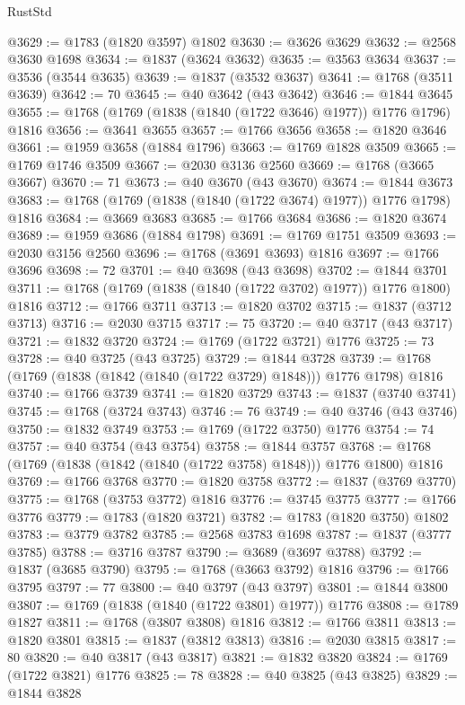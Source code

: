 \begin{lexlean}{RustStd}
\begin{coremodule}
@3629 := @1783 (@1820 @3597) @1802
@3630 := @3626 @3629
@3632 := @2568 @3630 @1698
@3634 := @1837 (@3624 @3632)
@3635 := @3563 @3634
@3637 := @3536 (@3544 @3635)
@3639 := @1837 (@3532 @3637)
@3641 := @1768 (@3511 @3639)
@3642 := 70
@3645 := @40 @3642 (@43 @3642)
@3646 := @1844 @3645
@3655 := @1768 (@1769 (@1838 (@1840 (@1722 @3646) @1977)) @1776 @1796) @1816
@3656 := @3641 @3655
@3657 := @1766 @3656
@3658 := @1820 @3646
@3661 := @1959 @3658 (@1884 @1796)
@3663 := @1769 @1828 @3509
@3665 := @1769 @1746 @3509
@3667 := @2030 @3136 @2560
@3669 := @1768 (@3665 @3667)
@3670 := 71
@3673 := @40 @3670 (@43 @3670)
@3674 := @1844 @3673
@3683 := @1768 (@1769 (@1838 (@1840 (@1722 @3674) @1977)) @1776 @1798) @1816
@3684 := @3669 @3683
@3685 := @1766 @3684
@3686 := @1820 @3674
@3689 := @1959 @3686 (@1884 @1798)
@3691 := @1769 @1751 @3509
@3693 := @2030 @3156 @2560
@3696 := @1768 (@3691 @3693) @1816
@3697 := @1766 @3696
@3698 := 72
@3701 := @40 @3698 (@43 @3698)
@3702 := @1844 @3701
@3711 := @1768 (@1769 (@1838 (@1840 (@1722 @3702) @1977)) @1776 @1800) @1816
@3712 := @1766 @3711
@3713 := @1820 @3702
@3715 := @1837 (@3712 @3713)
@3716 := @2030 @3715
@3717 := 75
@3720 := @40 @3717 (@43 @3717)
@3721 := @1832 @3720
@3724 := @1769 (@1722 @3721) @1776
@3725 := 73
@3728 := @40 @3725 (@43 @3725)
@3729 := @1844 @3728
@3739 := @1768 (@1769 (@1838 (@1842 (@1840 (@1722 @3729) @1848))) @1776 @1798) @1816
@3740 := @1766 @3739
@3741 := @1820 @3729
@3743 := @1837 (@3740 @3741)
@3745 := @1768 (@3724 @3743)
@3746 := 76
@3749 := @40 @3746 (@43 @3746)
@3750 := @1832 @3749
@3753 := @1769 (@1722 @3750) @1776
@3754 := 74
@3757 := @40 @3754 (@43 @3754)
@3758 := @1844 @3757
@3768 := @1768 (@1769 (@1838 (@1842 (@1840 (@1722 @3758) @1848))) @1776 @1800) @1816
@3769 := @1766 @3768
@3770 := @1820 @3758
@3772 := @1837 (@3769 @3770)
@3775 := @1768 (@3753 @3772) @1816
@3776 := @3745 @3775
@3777 := @1766 @3776
@3779 := @1783 (@1820 @3721)
@3782 := @1783 (@1820 @3750) @1802
@3783 := @3779 @3782
@3785 := @2568 @3783 @1698
@3787 := @1837 (@3777 @3785)
@3788 := @3716 @3787
@3790 := @3689 (@3697 @3788)
@3792 := @1837 (@3685 @3790)
@3795 := @1768 (@3663 @3792) @1816
@3796 := @1766 @3795
@3797 := 77
@3800 := @40 @3797 (@43 @3797)
@3801 := @1844 @3800
@3807 := @1769 (@1838 (@1840 (@1722 @3801) @1977)) @1776
@3808 := @1789 @1827
@3811 := @1768 (@3807 @3808) @1816
@3812 := @1766 @3811
@3813 := @1820 @3801
@3815 := @1837 (@3812 @3813)
@3816 := @2030 @3815
@3817 := 80
@3820 := @40 @3817 (@43 @3817)
@3821 := @1832 @3820
@3824 := @1769 (@1722 @3821) @1776
@3825 := 78
@3828 := @40 @3825 (@43 @3825)
@3829 := @1844 @3828

\end{coremodule}
\end{lexlean}
